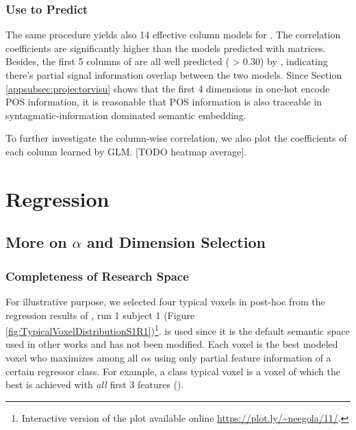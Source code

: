 \subsubsection{Use  to Predict }

The same procedure yields also 14 effective column models for . The correlation coefficients are significantly higher than the models predicted with  matrices. Besides, the first 5 columns of  are all well predicted ( > 0.30) by , indicating there's partial signal information overlap between the two models. Since Section \ref{appsubsec:projectorvisu} shows that the first 4 dimensions in  one-hot encode POS information, it is reasonable that POS information is also traceable in syntagmatic-information dominated semantic embedding.

To further investigate the column-wise correlation, we also plot the coefficients of each  column learned by GLM. [TODO heatmap average].

\section{Regression}
\subsection{More on \(\alpha\) and Dimension Selection}
\label{appsubsec:alphadim}

\subsubsection{Completeness of Research Space}

For illustrative purpose, we selected four typical voxels in post-hoc from the regression results of , run 1 subject 1 (Figure \ref{fig:TypicalVoxelDistributionS1R1})\footnote{Interactive version of the plot available online \url{https://plot.ly/~neegola/11/}.}.  is used since it is the default semantic space used in other works and has not been modified. Each voxel is the best modeled voxel who maximizes  among all \(\alpha\)s using only partial feature information of a certain regressor class. For example, a  class typical voxel is a voxel of which the best  is achieved with \emph{all} first 3 features (). 

